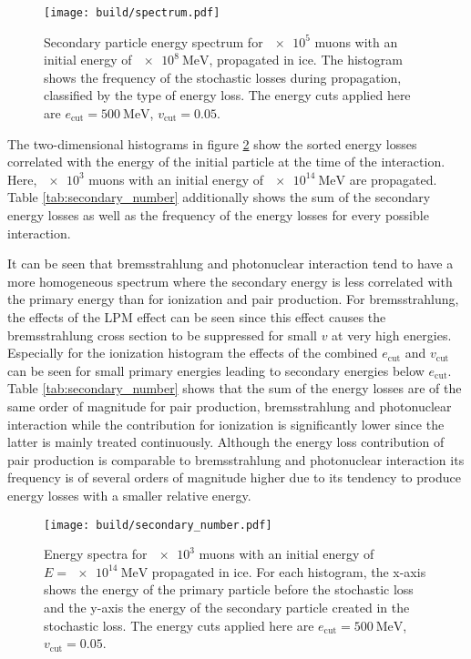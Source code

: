 \begin{figure}
    \centering
    \texttt{[image: build/spectrum.pdf]}
    \caption{Secondary particle energy spectrum for $\num{e5}$ muons with an initial energy of $\SI{e8}{\mega\electronvolt}$, propagated in ice. The histogram shows the frequency of the stochastic losses during propagation, classified by the type of energy loss. The energy cuts applied here are $e_\text{cut} = \SI{500}{\mega\electronvolt}$, $v_\text{cut} = 0.05$.}
    \label{fig:spectrum}
\end{figure}

The two-dimensional histograms in figure \ref{fig:secondary_number} show the sorted energy losses correlated with the energy of the initial particle at the time of the interaction.
Here, $\num{e3}$ muons with an initial energy of $\SI{e14}{\mega\electronvolt}$ are propagated.
Table \ref{tab:secondary_number} additionally shows the sum of the secondary energy losses as well as the frequency of the energy losses for every possible interaction.

It can be seen that bremsstrahlung and photonuclear interaction tend to have a more homogeneous spectrum where the secondary energy is less correlated with the primary energy than for ionization and pair production.
For bremsstrahlung, the effects of the LPM effect can be seen since this effect causes the bremsstrahlung cross section to be suppressed for small $v$ at very high energies.
Especially for the ionization histogram the effects of the combined $e_\text{cut}$ and $v_\text{cut}$ can be seen for small primary energies leading to secondary energies below $e_\text{cut}$.
Table \ref{tab:secondary_number} shows that the sum of the energy losses are of the same order of magnitude for pair production, bremsstrahlung and photonuclear interaction while the contribution for ionization is significantly lower since the latter is mainly treated continuously.
Although the energy loss contribution of pair production is comparable to bremsstrahlung and photonuclear interaction its frequency is of several orders of magnitude higher due to its tendency to produce energy losses with a smaller relative energy.

\begin{figure}
    \centering
    \texttt{[image: build/secondary\_number.pdf]}
    \caption{Energy spectra for $\num{e3}$ muons with an initial energy of $E = \SI{e14}{\mega\electronvolt}$ propagated in ice. For each histogram, the x-axis shows the energy of the primary particle before the stochastic loss and the y-axis the energy of the secondary particle created in the stochastic loss. The energy cuts applied here are $e_\text{cut} = \SI{500}{\mega\electronvolt}$, $v_\text{cut} = 0.05$.}
    \label{fig:secondary_number}
\end{figure}

